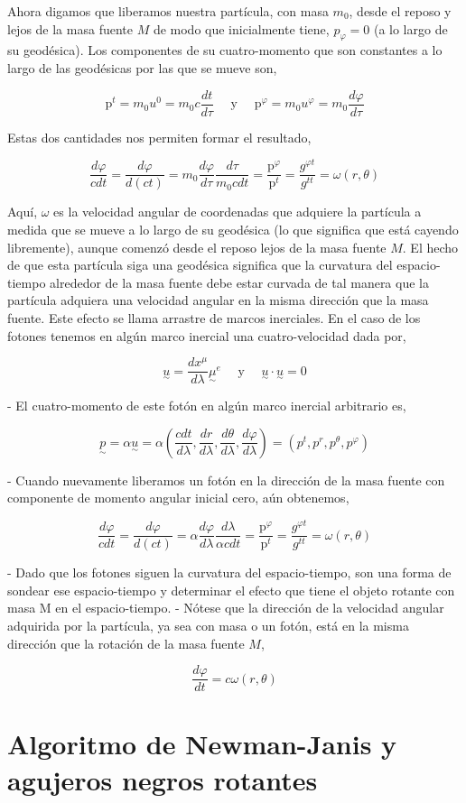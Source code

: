 Ahora digamos que liberamos nuestra partícula, con masa $m_0$, desde el reposo y lejos de la masa fuente $M$ de modo que inicialmente tiene, $p_{\varphi}=0$ (a lo largo de su geodésica). Los componentes de su cuatro-momento que son constantes a lo largo de las geodésicas por las que se mueve son,

$$
    \mathrm{p}^t=m_0 u^0=m_0 c \frac{d t}{d \tau} \quad \text { y } \quad \mathrm{p}^{\varphi}=m_0 u^{\varphi}=m_0 \frac{d \varphi}{d \tau}
$$

Estas dos cantidades nos permiten formar el resultado,

$$
    \frac{d \varphi}{c d t}=\frac{d \varphi}{d(c t)}=m_0 \frac{d \varphi}{d \tau} \frac{d \tau}{m_0 c d t}=\frac{\mathrm{p}^{\varphi}}{\mathrm{p}^t}=\frac{g^{\varphi t}}{g^{t t}}=\omega(r, \theta)
$$

Aquí, $\omega$ es la velocidad angular de coordenadas que adquiere la partícula a medida que se mueve a lo largo de su geodésica (lo que significa que está cayendo libremente), aunque comenzó desde el reposo lejos de la masa fuente $M$.
El hecho de que esta partícula siga una geodésica significa que la curvatura del espacio-tiempo alrededor de la masa fuente debe estar curvada de tal manera que la partícula adquiera una velocidad angular en la misma dirección que la masa fuente.
Este efecto se llama arrastre de marcos inerciales.
En el caso de los fotones tenemos en algún marco inercial una cuatro-velocidad dada por,

$$
    \underset{\sim}{u}=\frac{d x^\mu}{d \lambda}{\underset{\sim}{\mu}}^e \quad \text { y } \quad \underset{\sim}{u} \cdot \underset{\sim}{u}=0
$$

- El cuatro-momento de este fotón en algún marco inercial arbitrario es,

$$
    \underset{\sim}{p}=\alpha \underset{\sim}{u}=\alpha\left(\frac{c d t}{d \lambda}, \frac{d r}{d \lambda}, \frac{d \theta}{d \lambda}, \frac{d \varphi}{d \lambda}\right)=\left(p^t, p^r, p^\theta, p^{\varphi}\right)
$$

- Cuando nuevamente liberamos un fotón en la dirección de la masa fuente con componente de momento angular inicial cero, aún obtenemos,

$$
    \frac{d \varphi}{c d t}=\frac{d \varphi}{d(c t)}=\alpha \frac{d \varphi}{d \lambda} \frac{d \lambda}{\alpha c d t}=\frac{\mathrm{p}^{\varphi}}{\mathrm{p}^t}=\frac{g^{\varphi t}}{g^{t t}}=\omega(r, \theta)
$$

- Dado que los fotones siguen la curvatura del espacio-tiempo, son una forma de sondear ese espacio-tiempo y determinar el efecto que tiene el objeto rotante con masa M en el espacio-tiempo.
- Nótese que la dirección de la velocidad angular adquirida por la partícula, ya sea con masa o un fotón, está en la misma dirección que la rotación de la masa fuente $M$,

$$
    \frac{d \varphi}{d t}=c \omega(r, \theta)
$$

\section{Algoritmo de Newman-Janis y agujeros negros rotantes}